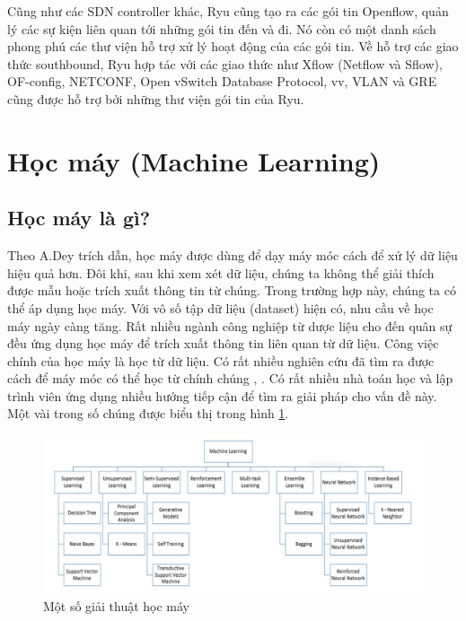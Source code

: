 Cũng như các SDN controller khác, Ryu cũng tạo ra các gói tin Openflow, quản lý các sự kiện liên quan tới những gói tin đến và đi. Nó còn có một danh sách phong phú các thư viện hỗ trợ xử lý hoạt động của các gói tin. Về hỗ trợ các giao thức southbound, 	Ryu hợp tác với các giao thức như Xflow (Netflow và Sflow), OF-config, NETCONF, Open vSwitch Database Protocol, vv, VLAN và GRE cũng được hỗ trợ bởi những thư viện gói tin của Ryu.

\section{Học máy (Machine Learning)}

\subsection{Học máy là gì?}

Theo A.Dey \cite{18-Dey} trích dẫn, học máy được dùng để dạy máy móc cách để xử lý dữ liệu hiệu quả hơn. Đôi khi, sau khi xem xét dữ liệu, chúng ta không thể giải thích được mẫu hoặc trích xuất thông tin từ chúng. Trong trường hợp này, chúng ta có thể áp dụng học máy. Với vô số tập dữ liệu (dataset) hiện có, nhu cầu về học máy ngày càng tăng. Rất nhiều ngành công nghiệp từ dược liệu cho đến quân sự đều ứng dụng học máy để trích xuất thông tin liên quan từ dữ liệu. Công việc chính của học máy là học từ dữ liệu. Có rất nhiều nghiên cứu đã tìm ra được cách để máy móc có thể học từ chính chúng \cite{19-Welling}, \cite{20-Bowles}. Có rất nhiều nhà toán học và lập trình viên ứng dụng nhiều hướng tiếp cận để tìm ra giải pháp cho vấn đề này. Một vài trong số chúng được biểu thị trong hình \ref{fig:ml-algo}.

\begin{figure}[ht!]
	\includegraphics[width=\linewidth]{fig/ml-algo.png}
	\caption{Một số giải thuật học máy \cite{18-Dey}}
	\label{fig:ml-algo}
\end{figure}

